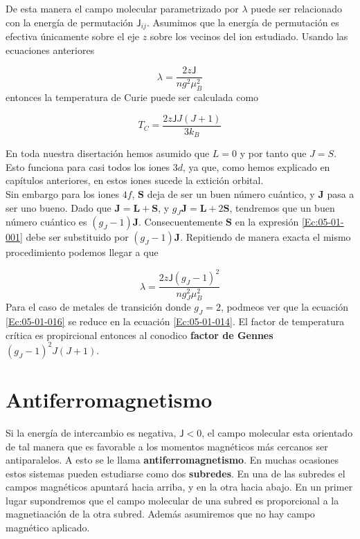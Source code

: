 \documentclass[12pt,a4paper]{book}
\numberwithin{equation}{section}
\numberwithin{figure}{section}
\newcommand{\Jsf}{\mathsf{J}}
\newcommand{\Jn}{\mathbf{J}}
\newcommand{\Ln}{\mathbf{L}}
\newcommand{\Sn}{\mathbf{S}}
\begin{document}
De esta manera el campo molecular parametrizado por $\lambda$ puede ser relacionado con la energía de permutación $\Jsf_{ij}$. Asumimos que la energía de permutación es efectiva únicamente sobre el eje $z$ sobre los vecinos del ion estudiado. Usando las ecuaciones anteriores 

\begin{equation}
    \lambda = \frac{2z\Jsf}{n g^2 \mu_B^2} \label{Ec:05-01-014}
\end{equation}
entonces la temperatura de Curie puede ser calculada como

\begin{equation}
    T_C = \frac{2z \Jsf J(J+1)}{3k_B}
\end{equation}

En toda nuestra disertación hemos asumido que $L=0$ y por tanto que $J=S$. Esto funciona para casi todos los iones $3d$, ya que, como hemos explicado en capítulos anteriores, en estos iones sucede la extición orbital. \\

Sin embargo para los iones $4f$, $\Sn$ deja de ser un buen número cuántico, y $\Jn$ pasa a ser uno bueno. Dado que $\Jn=\Ln+\Sn$, y $g_J \Jn = \Ln + 2 \Sn$, tendremos que un buen número cuántico es $(g_J-1)\Jn$. Consecuentemente $\Sn$ en la expresión \ref{Ec:05-01-001} debe ser substituido por $(g_J-1)\Jn$. Repitiendo de manera exacta el mismo procedimiento podemos llegar a que

\begin{equation}
    \lambda = \frac{2 z \Jsf (g_J-1)^2}{n g_J^2 \mu_B^2} \label{Ec:05-01-016}
\end{equation}
Para el caso de metales de transición donde $g_J=2$, podmeos ver que la ecuación \ref{Ec:05-01-016} se reduce en la ecuación \ref{Ec:05-01-014}. El factor de temperatura crítica es propircional entonces al conodico \textbf{factor de Gennes} $(g_J-1)^2J(J+1)$.  

\section{Antiferromagnetismo}

Si la energía de intercambio es negativa, $\Jsf<0$, el campo molecular esta orientado de tal manera que es favorable a los momentos magnéticos más cercanos ser antiparalelos. A esto se le llama \textbf{antiferromagnetismo}. En muchas ocasiones estos sistemas pueden estudiarse como dos \textbf{subredes}. En una de las subredes el campos magnéticos apuntará hacia arriba, y en la otra hacia abajo. En un primer lugar supondremos que el campo molecular de una subred es proporcional a la magnetiaación de la otra subred. Además asumiremos que no hay campo magnético aplicado. 
\end{document}
